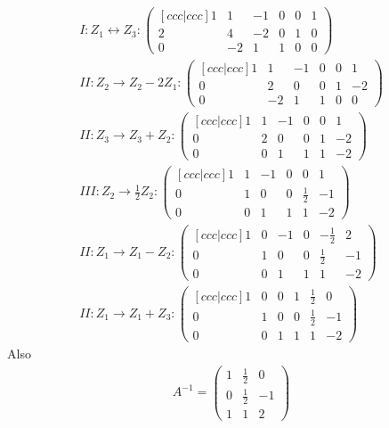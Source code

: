 \documentclass[11pt]{report}
\begin{document}
\begin{align}
I: Z_1 \leftrightarrow Z_3 : \begin{pmatrix}[ccc|ccc] 1 & 1 & -1 & 0 & 0 & 1 \\ 2 & 4 & -2 & 0 & 1 & 0\\ 0 & -2 & 1 & 1 & 0 & 0 \end{pmatrix} \\
II: Z_2 \rightarrow Z_2 - 2 Z_1 : \begin{pmatrix}[ccc|ccc] 1 & 1 & -1 & 0 & 0 & 1 \\ 0 & 2 & 0 & 0 & 1 & -2 \\ 0 & -2 & 1 & 1 & 0 & 0 \end{pmatrix} \\
II: Z_3 \rightarrow Z_3 + Z_2 : \begin{pmatrix}[ccc|ccc] 1 & 1 & -1 & 0 & 0 & 1 \\ 0 & 2 & 0 & 0 & 1 & -2 \\ 0 & 0 & 1 & 1 & 1 & -2 \end{pmatrix} \\
III: Z_2 \rightarrow \frac{1}{2} Z_2 : \begin{pmatrix}[ccc|ccc] 1 & 1 & -1 & 0 & 0 & 1 \\ 0 & 1 & 0 & 0 & \frac{1}{2} & -1 \\ 0 & 0 & 1 & 1 & 1 & -2 \end{pmatrix} \\
II: Z_1 \rightarrow Z_1-Z_2 : \begin{pmatrix}[ccc|ccc] 1 & 0 & -1 & 0 & -\frac{1}{2} & 2 \\ 0 & 1 & 0 & 0 & \frac{1}{2} & -1 \\ 0 & 0 & 1 & 1 & 1 & -2 \end{pmatrix} \\
II: Z_1 \rightarrow Z_1 + Z_3 : \begin{pmatrix}[ccc|ccc] 1 & 0 & 0 & 1 & \frac{1}{2} & 0 \\ 0 & 1 & 0 & 0 & \frac{1}{2} & -1 \\ 0 & 0 & 1 & 1 & 1 & -2 \end{pmatrix}
\end{align}
Also
\begin{align}
A^{-1} = \begin{pmatrix} 1 & \frac{1}{2} & 0 \\ 0 & \frac{1}{2} & -1 \\ 1 & 1 & 2 \end{pmatrix}
\end{align}
\end{document}
